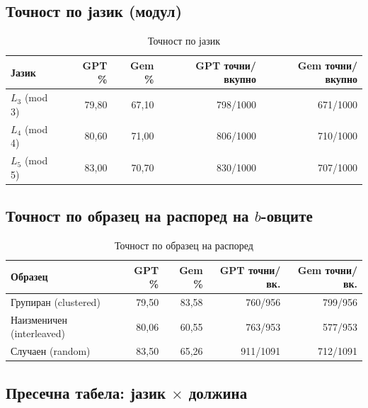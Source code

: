 \documentclass[12pt,a4paper]{article}
\theoremstyle{definition}
\begin{document}
\subsection{Точност по јазик (модул)}

\begin{table}[H]
\centering
\begin{tabular}{lrrrr}
\toprule
\textbf{Јазик} & \textbf{GPT \%} & \textbf{Gem \%} & \textbf{GPT точни/вкупно} & \textbf{Gem точни/вкупно} \\
\midrule
$L_3$ (mod 3) & 79,80 & 67,10 & 798/1000 & 671/1000 \\
$L_4$ (mod 4) & 80,60 & 71,00 & 806/1000 & 710/1000 \\
$L_5$ (mod 5) & 83,00 & 70,70 & 830/1000 & 707/1000 \\
\bottomrule
\end{tabular}
\caption{Точност по јазик}
\end{table}

\subsection{Точност по образец на распоред на $b$-овците}

\begin{table}[H]
\centering
\begin{tabular}{lrrrr}
\toprule
\textbf{Образец} & \textbf{GPT \%} & \textbf{Gem \%} & \textbf{GPT точни/вк.} & \textbf{Gem точни/вк.} \\
\midrule
Групиран (clustered)      & 79,50 & 83,58 & 760/956  & 799/956  \\
Наизменичен (interleaved) & 80,06 & 60,55 & 763/953  & 577/953  \\
Случаен (random)          & 83,50 & 65,26 & 911/1091 & 712/1091 \\
\bottomrule
\end{tabular}
\caption{Точност по образец на распоред}
\end{table}

\subsection{Пресечна табела: јазик $\times$ должина}
\end{document}
